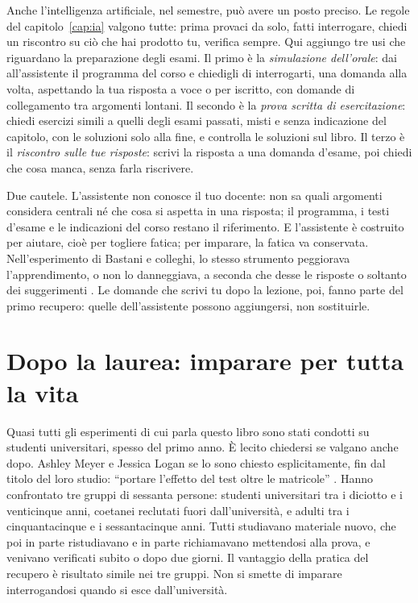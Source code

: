 Anche l'intelligenza artificiale, nel semestre, può avere un posto
preciso. Le regole del capitolo~\ref{cap:ia} valgono tutte: prima
provaci da solo, fatti interrogare, chiedi un riscontro su ciò che hai
prodotto tu, verifica sempre. Qui aggiungo tre usi che riguardano la
preparazione degli esami. Il primo è la \emph{simulazione dell'orale}:
dai all'assistente il programma del corso e chiedigli di interrogarti,
una domanda alla volta, aspettando la tua risposta a voce o per
iscritto, con domande di collegamento tra argomenti lontani. Il secondo
è la \emph{prova scritta di esercitazione}: chiedi esercizi simili a
quelli degli esami passati, misti e senza indicazione del capitolo, con
le soluzioni solo alla fine, e controlla le soluzioni sul libro. Il
terzo è il \emph{riscontro sulle tue risposte}: scrivi la risposta a
una domanda d'esame, poi chiedi che cosa manca, senza farla riscrivere.

Due cautele. L'assistente non conosce il tuo docente: non sa quali
argomenti considera centrali né che cosa si aspetta in una risposta;
il programma, i testi d'esame e le indicazioni del corso restano il
riferimento. E l'assistente è costruito per aiutare, cioè per togliere
fatica; per imparare, la fatica va conservata. Nell'esperimento di
Bastani e colleghi, lo stesso strumento peggiorava l'apprendimento, o
non lo danneggiava, a seconda che desse le risposte o soltanto dei
suggerimenti \parencite{bastani2025}. Le domande che scrivi tu dopo la
lezione, poi, fanno parte del primo recupero: quelle dell'assistente
possono aggiungersi, non sostituirle.

\section{Dopo la laurea: imparare per tutta la vita}

Quasi tutti gli esperimenti di cui parla questo libro sono stati
condotti su studenti universitari, spesso del primo anno. È lecito
chiedersi se valgano anche dopo. Ashley Meyer e Jessica Logan se lo
sono chiesto esplicitamente, fin dal titolo del loro studio:
\enquote{portare l'effetto del test oltre le matricole}
\parencite{meyer2013}. Hanno confrontato tre gruppi di sessanta
persone: studenti universitari tra i diciotto e i venticinque anni,
coetanei reclutati fuori dall'università, e adulti tra i
cinquantacinque e i sessantacinque anni. Tutti studiavano materiale
nuovo, che poi in parte ristudiavano e in parte richiamavano
mettendosi alla prova, e venivano verificati subito o dopo due giorni. Il vantaggio della pratica del
recupero è risultato simile nei tre gruppi. Non si smette di imparare
interrogandosi quando si esce dall'università.

